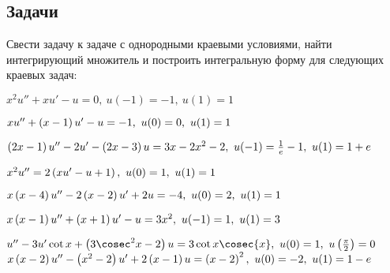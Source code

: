 \subsection{Задачи}

	Свести задачу к задаче с однородными краевыми условиями, найти интегрирующий множитель и построить интегральную форму для следующих краевых задач:
	\begin{enumtasks}

		\label{bvp_green:int_factor}
		\item \( x^2 u'' + xu' - u = 0, ~ u(-1) = -1, ~ u(1) = 1 \) %
		\item \( xu'' + \left( x - 1 \right) u' - u = -1, ~ u(0) = 0, ~ u(1) = 1 \) %
		\item \( \left( 2x - 1 \right) u'' - 2u' - \left( 2x - 3 \right) u = 3x - 2x^2 - 2, ~ u(-1) = \frac{1}{e} - 1, ~ u(1) = 1 + e \) %
		\item \( x^2 u'' = 2 \left( xu' - u + 1 \right), ~ u(0) = 1, ~ u(1) = 1 \) %
		\item \( x \left( x - 4 \right) u'' - 2 \left( x - 2 \right) u' + 2u = - 4, ~ u(0) = 2, ~ u(1) = 1 \) %
		\item \( x \left( x - 1 \right) u'' + \left( x + 1 \right) u' - u = 3x^2, ~ u(-1) = 1, ~ u(1) = 3 \) %
		\item \( u'' - 3u' \cot{x} + \pares{3 \cosec^2{x} - 2} u = 3 \cot{x} \cosec{x}, ~ u(0) = 1, ~ u\pares{\frac{\pi}{2}} = 0 \) %
		\itemstar \( x \left( x - 2 \right) u'' - \left( x^2 - 2 \right) u' + 2 \left( x - 1 \right) u = \left( x - 2 \right)^2, ~ u(0) = -2, ~ u(1) = 1 - e \) %

\end{enumtasks}
